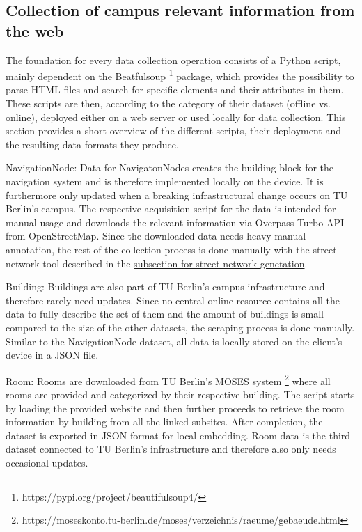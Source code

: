 \subsection{Collection of campus relevant information from the web}
The foundation for every data collection operation consists of a Python script, mainly dependent on the Beatfulsoup \footnote{https://pypi.org/project/beautifulsoup4/} package, which provides the possibility to parse HTML files and search for specific elements and their attributes in them. These scripts are then, according to the category of their dataset (offline vs. online), deployed either on a web server or used locally for data collection. This section provides a short overview of the different scripts, their deployment and the resulting data formats they produce.

NavigationNode: Data for NavigatonNodes creates the building block for the navigation system and is therefore implemented locally on the device. It is furthermore only updated when a breaking infrastructural change occurs on TU Berlin's campus. The respective acquisition script for the data is intended for manual usage and downloads the relevant information via Overpass Turbo API from OpenStreetMap. Since the downloaded data needs heavy manual annotation, the rest of the collection process is done manually with the street network tool described in the \hyperref[sub_sec:street_network_generation]{subsection for street network genetation}.

Building: Buildings are also part of TU Berlin's campus infrastructure and therefore rarely need updates. Since no central online resource contains all the data to fully describe the set of them and the amount of buildings is small compared to the size of the other datasets, the scraping process is done manually. Similar to the NavigationNode dataset, all data is locally stored on the client's device in a JSON file.

Room: Rooms are downloaded from TU Berlin's MOSES system \footnote{https://moseskonto.tu-berlin.de/moses/verzeichnis/raeume/gebaeude.html} where all rooms are provided and categorized by their respective building. The script starts by loading the provided website and then further proceeds to retrieve the room information by building from all the linked subsites. After completion, the dataset is exported in JSON format for local embedding. Room data is the third dataset connected to TU Berlin's infrastructure and therefore also only needs occasional updates.

